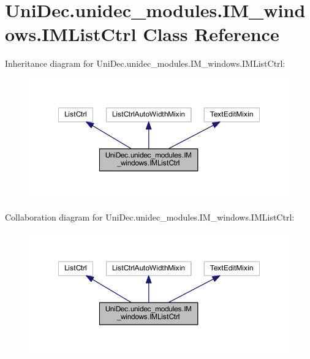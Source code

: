 \hypertarget{class_uni_dec_1_1unidec__modules_1_1_i_m__windows_1_1_i_m_list_ctrl}{}\section{Uni\+Dec.\+unidec\+\_\+modules.\+I\+M\+\_\+windows.\+I\+M\+List\+Ctrl Class Reference}
\label{class_uni_dec_1_1unidec__modules_1_1_i_m__windows_1_1_i_m_list_ctrl}


Inheritance diagram for Uni\+Dec.\+unidec\+\_\+modules.\+I\+M\+\_\+windows.\+I\+M\+List\+Ctrl\+:\nopagebreak
\begin{figure}[H]
\begin{center}
\leavevmode
\includegraphics[width=350pt]{class_uni_dec_1_1unidec__modules_1_1_i_m__windows_1_1_i_m_list_ctrl__inherit__graph}
\end{center}
\end{figure}


Collaboration diagram for Uni\+Dec.\+unidec\+\_\+modules.\+I\+M\+\_\+windows.\+I\+M\+List\+Ctrl\+:\nopagebreak
\begin{figure}[H]
\begin{center}
\leavevmode
\includegraphics[width=350pt]{class_uni_dec_1_1unidec__modules_1_1_i_m__windows_1_1_i_m_list_ctrl__coll__graph}
\end{center}
\end{figure}
